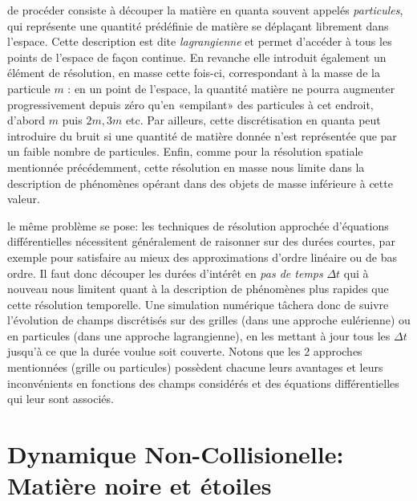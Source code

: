  de procéder consiste à découper la matière en quanta souvent appelés \textit{particules}, qui représente une quantité prédéfinie de matière se déplaçant librement dans l'espace. Cette description est dite \textit{lagrangienne} et permet d'accéder à tous les points de l'espace de façon continue. En revanche elle introduit également un élément de résolution, en masse cette fois-ci, correspondant à la masse de la particule $m$ : en un point de l'espace, la quantité matière ne pourra augmenter progressivement depuis zéro qu'en «empilant» des particules à cet endroit, d'abord $m$ puis $2m,3m$ etc. Par ailleurs, cette discrétisation en quanta peut introduire du bruit si une quantité de matière donnée n'est représentée que par un faible nombre de particules. Enfin, comme pour la résolution spatiale mentionnée précédemment, cette résolution en masse nous limite dans la description de phénomènes opérant dans des objets de masse inférieure à cette valeur.

 le même problème se pose: les techniques de résolution approchée d'équations différentielles nécessitent généralement de raisonner sur des durées courtes, par exemple pour satisfaire au mieux des approximations d'ordre linéaire ou de bas ordre. Il faut donc découper les durées d'intérêt en \textit{pas de temps} $\Delta t$ qui à nouveau nous limitent quant à la description de phénomènes plus rapides que cette résolution temporelle. Une simulation numérique tâchera donc de suivre l'évolution de champs discrétisés sur des grilles (dans une approche eulérienne) ou en particules (dans une approche lagrangienne), en les mettant à jour tous les $\Delta t$ jusqu'à ce que la durée voulue soit couverte. Notons que les 2 approches mentionnées (grille ou particules) possèdent chacune leurs avantages et leurs inconvénients en fonctions des champs considérés et des équations différentielles qui leur sont associés.


\section{Dynamique Non-Collisionelle: Matière noire et étoiles}

